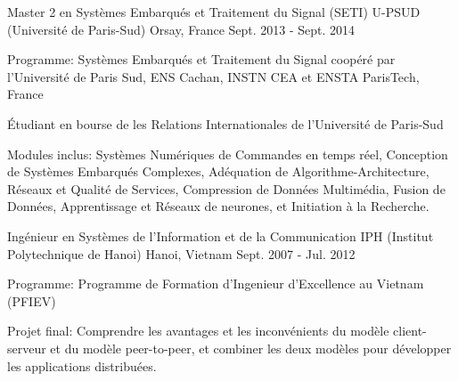 \begin{cventries}
\cventry
{Master 2 en Systèmes Embarqués et Traitement du Signal (SETI)} %
{U-PSUD (Université de Paris-Sud)} %
{Orsay, France} %
{Sept. 2013 - Sept. 2014} %
{ %
	\begin{cvitems}
		\item {Programme: Systèmes Embarqués et Traitement du Signal coopéré par l'Université de Paris Sud, ENS Cachan, INSTN CEA et ENSTA ParisTech, France}		
		\item {Étudiant en bourse de les Relations Internationales de l'Université de Paris-Sud}
		\item {Modules inclus: Systèmes Numériques de Commandes en temps réel, Conception de Systèmes Embarqués Complexes, Adéquation de Algorithme-Architecture, Réseaux et Qualité de Services, Compression de Données Multimédia, Fusion de Données, Apprentissage et Réseaux de neurones, et Initiation à la Recherche.}
	\end{cvitems}
}


\cventry
{Ingénieur en Systèmes de l'Information et de la Communication} %
{IPH (Institut Polytechnique de Hanoi)} %
{Hanoi, Vietnam} %
{Sept. 2007 - Jul. 2012} %
{ %
\begin{cvitems}
\item {Programme: Programme de Formation d'Ingenieur d'Excellence au Vietnam (PFIEV)}
\item {Projet final: Comprendre les avantages et les inconvénients du modèle client-serveur et du modèle peer-to-peer, et combiner les deux modèles pour développer les applications distribuées.}
\end{cvitems}
}


\end{cventries}